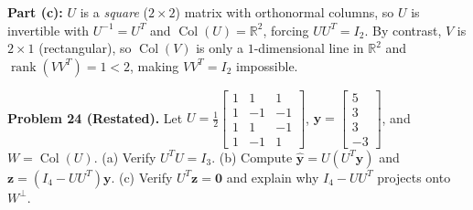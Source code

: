 \documentclass[11pt, letterpaper]{article}
\theoremstyle{definition}
\theoremstyle{remark}
\newcommand{\R}{\mathbb{R}}
\begin{document}
\textbf{Part (c):} $U$ is a \emph{square} ($2 \times 2$) matrix with orthonormal columns, so $U$ is invertible with $U^{-1} = U^T$ and $\operatorname{Col}(U) = \R^2$, forcing $UU^T = I_2$. By contrast, $V$ is $2 \times 1$ (rectangular), so $\operatorname{Col}(V)$ is only a $1$-dimensional line in $\R^2$ and $\operatorname{rank}(VV^T) = 1 < 2$, making $VV^T = I_2$ impossible.

\medskip
\textbf{Problem 24 (Restated).} Let $U = \frac{1}{2}\begin{bmatrix} 1 & 1 & 1 \\ 1 & -1 & -1 \\ 1 & 1 & -1 \\ 1 & -1 & 1 \end{bmatrix}$, $\mathbf{y} = \begin{bmatrix} 5 \\ 3 \\ 3 \\ -3 \end{bmatrix}$, and $W = \operatorname{Col}(U)$. (a) Verify $U^T U = I_3$. (b) Compute $\hat{\mathbf{y}} = U(U^T \mathbf{y})$ and $\mathbf{z} = (I_4 - UU^T)\mathbf{y}$. (c) Verify $U^T \mathbf{z} = \mathbf{0}$ and explain why $I_4 - UU^T$ projects onto $W^\perp$.
\end{document}
